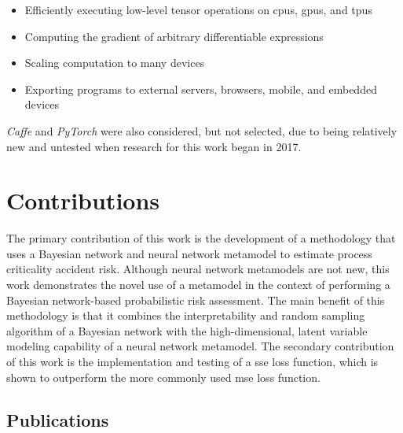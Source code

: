 \begin{itemize}
  \item Efficiently executing low-level tensor operations on \gls{cpu}s, \gls{gpu}s, and \gls{tpu}s
  \item Computing the gradient of arbitrary differentiable expressions
  \item Scaling computation to many devices
  \item Exporting programs to external servers, browsers, mobile, and embedded devices
\end{itemize}

\noindent \textit{Caffe} and \textit{PyTorch} were also considered, but not selected, due to being relatively new and untested when research for this work began in 2017.


\section{Contributions}

The primary contribution of this work is the development of a methodology that uses a Bayesian network and neural network metamodel to estimate process criticality accident risk.
Although neural network metamodels are not new, this work demonstrates the novel use of a metamodel in the context of performing a Bayesian network-based probabilistic risk assessment.
The main benefit of this methodology is that it combines the interpretability and random sampling algorithm of a Bayesian network with the high-dimensional, latent variable modeling capability of a neural network metamodel.
The secondary contribution of this work is the implementation and testing of a \gls{sse} loss function, which is shown to outperform the more commonly used \gls{mse} loss function.

\subsection{Publications}

